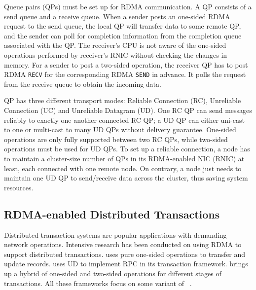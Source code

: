 Queue pairs (QPs) must be set up for RDMA communication. A QP consists of a send queue and a receive queue. When a sender posts an one-sided RDMA request to the send queue, the local QP will transfer data to some remote QP, and the sender can poll for completion information from the completion queue associated with the QP.
The receiver's CPU is not aware of the one-sided operations performed by receiver's RNIC without checking the changes in memory. For a sender to post a two-sided operation, the receiver QP has to post RDMA \texttt{RECV} for the corresponding RDMA \texttt{SEND} in advance. It polls the request from the receive queue to obtain the incoming data.

QP has three different transport modes: Reliable Connection (RC), Unreliable Connection (UC) and Unreliable Datagram (UD). One RC QP can send messages reliably to exactly one another connected RC QP; a UD QP can either uni-cast to one or multi-cast to many UD QPs without delivery guarantee. One-sided operations are only fully supported between two RC QPs, while two-sided operations must be used for UD QPs. To set up a reliable connection, a node has to maintain a cluster-size number of QPs in its RDMA-enabled NIC (RNIC) at least, each connected with one remote node. On contrary, a node just needs to maintain one UD QP to send/receive data across the cluster, thus saving system resources.

\subsection{RDMA-enabled Distributed Transactions}

Distributed transaction systems are popular applications with demanding network operations. 
Intensive research has been conducted
on using RDMA to support distributed transactions. \cite{chen2016fast} uses pure one-sided operations to transfer and update records. \cite{kalia2016fasst} uses UD to implement RPC in its transaction framework. \cite{wei2018deconstructing} brings up a hybrid of one-sided and two-sided operations for different stages of transactions. All these frameworks focus on some variant of \occ~\cite{kung1981optimistic}.



